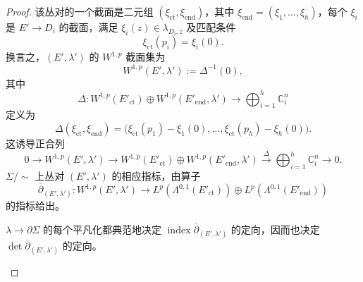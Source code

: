 \begin{proof}
该丛对的一个截面是二元组 $(\xi_{\mathrm{ct}},\xi_{\mathrm{end}})$，其中
$\xi_{\mathrm{end}}=(\xi_1,\ldots,\xi_h)$，每个 $\xi_i$ 是 $E'\to D_i$ 的截面，满足
$\xi_i(z)\in\lambda_{D_i,z}$ 及匹配条件
\begin{equation}
 \xi_{\mathrm{ct}}(p_i)=\xi_i(0).
 \label{eq:nodal-section-matching}
\end{equation}
换言之，$(E',\lambda')$ 的 $W^{1,p}$ 截面集为
\[
 W^{1,p}(E',\lambda'):=\Delta^{-1}(0),
\]
其中
\[
 \Delta:W^{1,p}(E'_{\mathrm{ct}})
 \oplus W^{1,p}(E'_{\mathrm{end}},\lambda')
 \longrightarrow\bigoplus_{i=1}^h\mathbb C_i^n
\]
定义为
\[
 \Delta(\xi_{\mathrm{ct}},\xi_{\mathrm{end}})
 =\bigl(\xi_{\mathrm{ct}}(p_1)-\xi_1(0),\ldots,
 \xi_{\mathrm{ct}}(p_h)-\xi_h(0)\bigr).
\]
这诱导正合列
\[
 0\to W^{1,p}(E',\lambda')
 \to W^{1,p}(E'_{\mathrm{ct}})\oplus W^{1,p}(E'_{\mathrm{end}},\lambda')
 \xrightarrow{\Delta}\bigoplus_{i=1}^h\mathbb C_i^n\to0.
\]
$\Sigma/{\sim}$ 上丛对 $(E',\lambda')$ 的相应指标，由算子
\[
 \overline\partial_{(E',\lambda')}:
 W^{1,p}(E',\lambda')\longrightarrow
 L^p(\Lambda^{0,1}(E'_{\mathrm{ct}}))
 \oplus L^p(\Lambda^{0,1}(E'_{\mathrm{end}}))
\]
的指标给出。

\begin{lemma}
\label{lem:boundary-trivialization-orients-nodal-index}
$\lambda\to\partial\Sigma$ 的每个平凡化都典范地决定
$\operatorname{index}\overline\partial_{(E',\lambda')}$ 的定向，因而也决定
$\det\overline\partial_{(E',\lambda')}$ 的定向。
\end{lemma}


\end{proof}
